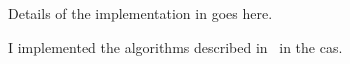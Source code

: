 Details of the implementation in \sympy goes here.

I implemented the algorithms described in~\cite{bronstein2005symbolic}
in the \sympy \gls{cas}.  
